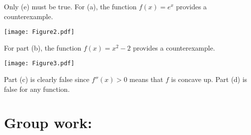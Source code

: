 \documentclass[handout,nooutcomes]{ximera}
\begin{document}
\begin{enumerate}
\begin{enumerate}
		\end{enumerate}

			\begin{freeResponse}
			Only (e) must be true.  For (a), the function $f(x) = e^x$ provides a counterexample.
			
			\begin{image}
			\texttt{[image: Figure2.pdf]}
			\end{image}
			
			For part (b), the function $f(x) = x^2 -2$ provides a counterexample.
			
			\begin{image}
			\texttt{[image: Figure3.pdf]}
			\end{image}
			
			Part (c) is clearly false since $f''(x) > 0$ means that $f$ is concave up.  Part (d) is false for any function.
			
			\end{freeResponse}	
		
		
		
	\end{enumerate}
		
		
		

	
\newpage
	
	
	

\section*{Group work:}
\end{document}
